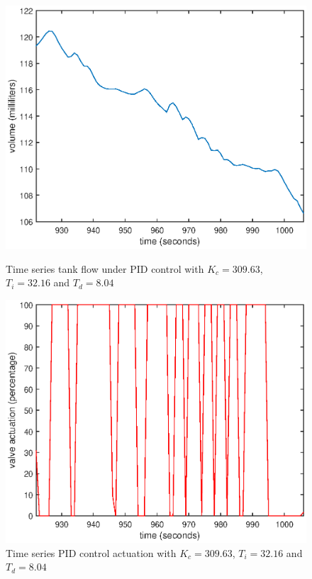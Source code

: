 \documentclass{article}
\begin{document}
\begin{figure}[h]
	\centering
	\begin{minipage}{0.45\textwidth}
		\centering
		\includegraphics[scale=0.4]{s_curve_1_level}
		\caption{Time series tank flow under PID control with $K_c = 309.63$, $T_i = 32.16$ and $T_d = 8.04$}
	\end{minipage}
	\hspace{0.5cm}
	\begin{minipage}{0.45\textwidth}
		\centering
		\includegraphics[scale=0.4]{s_curve_1_control}
		\caption{Time series PID control actuation with $K_c = 309.63$, $T_i = 32.16$ and $T_d = 8.04$}
	\end{minipage}
\end{figure}
\end{document}
